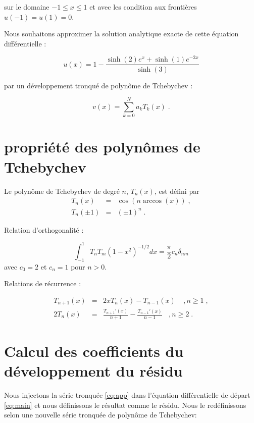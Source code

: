 \documentclass{report}
\begin{document}
sur le domaine $-1\leq x \leq 1$ et avec les condition aux frontières $u(-1)=u(1)=0$.

Nous souhaitons approximer la solution analytique exacte de cette équation différentielle :

\begin{equation}
u(x) = 1- \frac{\sinh(2)e^{x}+\sinh(1)e^{-2x}}{\sinh(3)}
\end{equation}

par un développement tronqué de polynôme de Tchebychev :

\begin{equation}\label{eq:app}
v(x) = \sum_{k=0}^N a_k T_k(x) \;.
\end{equation}

\section{propriété des polynômes de Tchebychev}

Le polynôme de Tchebychev de degré $n$, $T_n(x)$, est défini par
\begin{eqnarray}
T_n(x) &=& \cos (n\arccos(x))\;,\\
T_n(\pm1) &=& (\pm1)^n\;.
\end{eqnarray}

Relation d'orthogonalité :

\begin{equation}
\int_{-1}^{1} T_n T_m (1-x^2)^{-1/2} dx = \frac{\pi}{2} c_n \delta_{nm}
\end{equation}
avec $c_0=2$ et $c_n = 1$ pour $n>0$.

Relations de récurrence :

\begin{eqnarray}
T_{n+1}(x) & = & 2xT_n(x) - T_{n-1}(x) \ \ \ \ \ , n \geq 1\;,\\
2T_n (x) & = & \frac{T_{n+1}'(x)}{n+1} - \frac{T_{n-1}'(x)}{n-1} \ \ \ \ , n \geq 2\;.\label{eq:rec}
\end{eqnarray}

\section{Calcul des coefficients du développement du résidu}

Nous injectons la série tronquée \eqref{eq:app} dans l'équation différentielle de départ \eqref{eq:main} et nous définissons le résultat comme le résidu. Nous le redéfinissons selon une nouvelle série tronquée de polynôme de Tchebychev:
\end{document}
